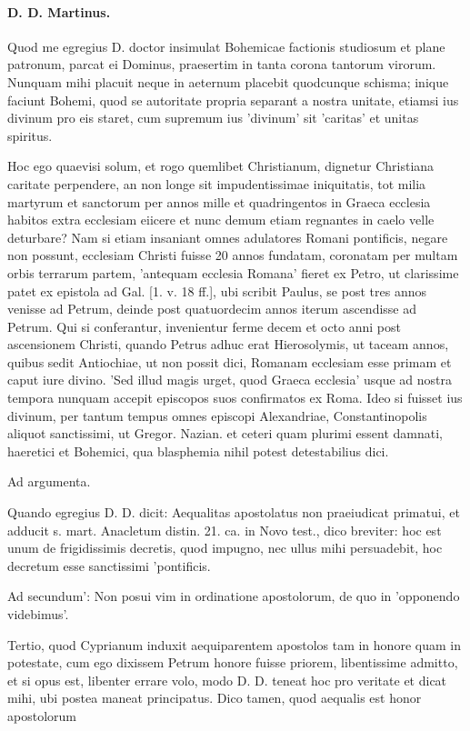 \paragraph*{D. D. Martinus.}

Quod me egregius D. doctor insimulat Bohemicae factionis studiosum et plane patronum, parcat ei Dominus, praesertim in tanta corona tantorum virorum. Nunquam mihi placuit neque in aeternum placebit quodcunque schisma; inique faciunt Bohemi, quod se autoritate propria separant a nostra unitate, etiamsi ius divinum pro eis staret, cum supremum \marginpar{\small[276]} ius 'divinum' sit 'caritas' et unitas spiritus.

Hoc ego quaevisi solum, et rogo quemlibet Christianum, dignetur Christiana caritate perpendere, an non longe sit impudentissimae iniquitatis, tot milia martyrum et sanctorum per annos mille et quadringentos in Graeca ecclesia habitos extra ecclesiam eiicere et nunc demum etiam regnantes in caelo velle deturbare? Nam si etiam insaniant omnes adulatores Romani pontificis, negare non possunt, ecclesiam Christi fuisse 20 annos fundatam, coronatam per multam orbis terrarum partem, 'antequam ecclesia Romana' fieret ex Petro, ut clarissime patet ex epistola ad Gal. [1. v. 18 ff.], ubi scribit Paulus, se post tres annos venisse ad Petrum, deinde post quatuordecim annos iterum ascendisse ad Petrum. Qui si conferantur, invenientur ferme decem et octo anni post ascensionem Christi, quando Petrus adhuc erat Hierosolymis, ut taceam annos, quibus sedit Antiochiae, ut non possit dici, Romanam ecclesiam esse primam et caput iure divino. 'Sed illud magis urget, quod Graeca ecclesia' usque ad nostra tempora nunquam accepit episcopos suos confirmatos ex Roma. Ideo si fuisset ius divinum, per tantum tempus omnes episcopi Alexandriae, Constantinopolis aliquot sanctissimi, ut Gregor. Nazian. et ceteri quam plurimi essent damnati, haeretici et Bohemici, qua blasphemia nihil potest detestabilius dici.

Ad argumenta.

Quando egregius D. D. dicit: Aequalitas apostolatus non praeiudicat primatui, et adducit s. mart. Anacletum distin. 21. ca. in Novo test., dico breviter: hoc est unum de frigidissimis decretis, quod impugno, nec ullus mihi persuadebit, hoc decretum esse sanctissimi 'pontificis.

Ad secundum': Non posui vim in ordinatione apostolorum, de quo in 'opponendo videbimus'.

Tertio, quod Cyprianum induxit aequiparentem apostolos tam in honore quam in potestate, cum ego dixissem Petrum honore fuisse priorem, libentissime admitto, et si opus est, libenter errare volo, modo D. D. teneat hoc pro veritate et dicat mihi, ubi postea maneat principatus. Dico tamen, quod aequalis est honor apostolorum

